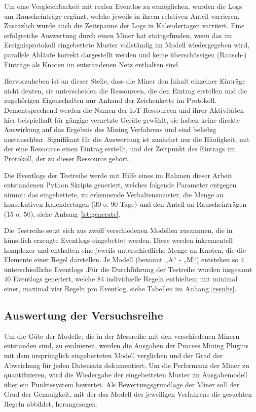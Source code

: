 Um eine Vergleichbarkeit mit realen Eventlos zu ermöglichen, wurden die Logs um Rauscheinträge ergänzt, welche jeweils in ihrem relativen Anteil varrieren. Zusätzlich wurde auch die Zeitspanne der Logs in Kalendertagen varriiert. Eine erfolgreiche Auswertung durch einen Miner hat stattgefunden, wenn das im Ereignisprotokoll eingebettete Muster vollständig im Modell wiedergegeben wird, parallele Abläufe korrekt dargestellt werden und keine überschüssigen (Rausch-) Einträge als Knoten im entstandenen Netz enthalten sind.

Hervorzuheben ist an dieser Stelle, dass die Miner den Inhalt einzelner Einträge nicht deuten, sie unterscheiden die Ressourcen, die den Eintrag erstellen und die zugehörigen Eigenschaften nur Anhand der Zeichenkette im Protokoll. Dementsprechend werden die Namen der IoT Ressourcen und ihrer Aktivitäten hier beispielhaft für gängige vernetzte Geräte gewählt, sie haben keine direkte Auswirkung auf das Ergebnis des Mining Verfahrens und sind beliebig austauschbar. Signifikant für die Auswertung ist zunächst nur die Häufigkeit, mit der eine Ressource einen Eintrag erstellt, und der Zeitpunkt des Eintrags im Protokoll, der zu dieser Ressource gehört.

Die Eventlogs der Testreihe werde mit Hilfe eines im Rahmen dieser Arbeit entstandenen Python Skripts generiert, welches folgende Parameter entgegen nimmt: das eingebettete, zu erkennende Verhaltensmuster, die Menge an konsekutiven Kalendertagen (30 o. 90 Tage) und den Anteil an Rauscheinträgen (15 o. 50), siehe Anhang \ref{lst:generate}. 

Die Testreihe setzt sich aus zwölf verschiedenen Modellen zusammen, die in künstlich erzeugte Eventlogs eingebettet werden. Diese werden inkrementell komplexer und enthalten eine jeweils unterschiedliche Menge an Knoten, die die Elemente einer Regel darstellen. Je Modell (benannt „A“ - „M“) entstehen so 4 unterschiedliche Eventlogs .Für die Durchführung der Testreihe wurden insgesamt 40 Eventlogs generiert, welche 84 individuelle Regeln enthielten; mit minimal einer, maximal vier Regeln pro Eventlog, siehe Tabellen im Anhang \ref{results}. 

\subsection{Auswertung der Versuchsreihe}
Um die Güte der Modelle, die in der Messreihe mit den verschiedenen Minern entstanden sind, zu evaluieren, werden die Ausgaben der Process Mining Plugins mit dem ursprünglich eingebetteten Modell verglichen und der Grad der Abweichung für jeden Datensatz dokumentiert. Um die Performanz der Miner zu quantifizieren, wird die Wiedergabe der eingebetteten Muster im Ausgabemodell über ein Punktesystem bewertet. Als Bewertungsgrundlage der Miner soll der Grad der Genauigkeit, mit der das Modell des jeweiligen Verfahrens die gesuchten Regeln abbildet, herangezogen. 


